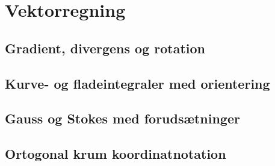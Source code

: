 \chapter{Vektorregning}
\section{Gradient, divergens og rotation}
\leavevmode\par

\section{Kurve- og fladeintegraler med orientering}
\leavevmode\par

\section{Gauss og Stokes med forudsætninger}
\leavevmode\par

\section{Ortogonal krum koordinatnotation}
\leavevmode\par
